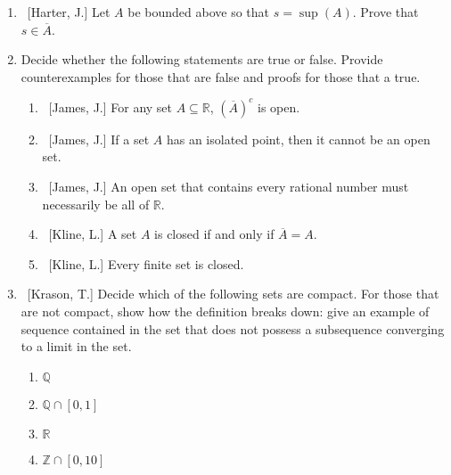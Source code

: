 \documentclass[10pt]{article}
\theoremstyle{definition}
\begin{document}
\begin{enumerate}

\item  ~[Harter, J.] Let $A$ be bounded above so that $s = \sup{(A)}$.  Prove that $s \in \overline{A}$.
	
	
\item  Decide whether the following statements are true or false.  Provide counterexamples for those that are false and proofs for those that a true.

	\begin{enumerate}
	
	\item  ~[James, J.] For any set $A \subseteq \mathbb{R}$, $(\overline{A})^c$ is open.
	
	\item  ~[James, J.] If a set $A$ has an isolated point, then it cannot be an open set.
	
	\item  ~[James, J.] An open set that contains every rational number must necessarily be all of $\mathbb{R}$.
	
	
	\item  ~[Kline, L.] A set $A$ is closed if and only if $\overline{A} = A$.
	
	\item  ~[Kline, L.] Every finite set is closed.
	
	
	
	\end{enumerate}
	

\item  ~[Krason, T.] Decide which of the following sets are compact.  For those that are not compact, show how the definition breaks down: give an example of sequence contained in the set that does not possess a subsequence converging to a limit in the set.

	\begin{enumerate}
	
	\item  $\mathbb{Q}$
	
	\item  $\mathbb{Q} \cap [0,1]$
	
	\item  $\mathbb{R}$
	
	\item  $\mathbb{Z} \cap [0,10]$
	

\end{enumerate}
\end{enumerate}
\end{document}
